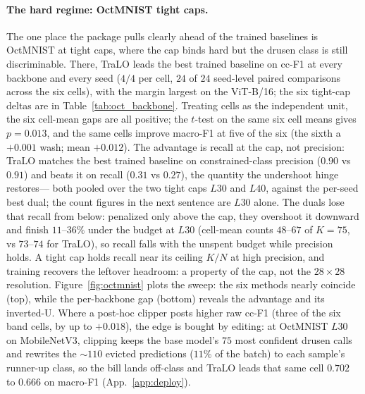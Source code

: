 \documentclass[10pt]{article}
\begin{document}
\paragraph{The hard regime: OctMNIST tight caps.}
The one place the package pulls clearly ahead of the trained baselines is
OctMNIST at tight caps, where the cap binds hard but the drusen class is
still discriminable. There, TraLO leads the best trained baseline on cc-F1
at every backbone and every seed ($4/4$ per cell, $24$ of $24$ seed-level
paired comparisons across the six cells), with the margin largest on the
ViT-B/16; the six tight-cap deltas are in Table~\ref{tab:oct_backbone}.
Treating cells as the independent unit, the six cell-mean gaps are all
positive; the $t$-test on the same six cell means gives $p{=}0.013$, and
the same cells improve macro-F1 at five of the six (the sixth a $+0.001$
wash; mean $+0.012$). The advantage is recall at the cap, not precision:
TraLO matches the best trained baseline on constrained-class precision
($0.90$ vs $0.91$) and beats it on recall ($0.31$ vs $0.27$), the quantity
the undershoot hinge restores{--- both pooled over the two tight
caps $L30$ and $L40$, against the per-seed best dual; the count figures in the
next sentence are $L30$ alone}. The duals lose that recall from below:
penalized only above the cap, they overshoot it downward and finish
$11$--$36\%$ under the budget at $L30$ (cell-mean counts $48$--$67$ of
$K{=}75$, vs $73$--$74$ for TraLO), so recall falls with the unspent
budget while precision holds. A tight cap holds recall near its ceiling
$K/N$ at high precision, and training recovers the leftover headroom: a
property of the cap, not the $28{\times}28$ resolution. Figure~\ref{fig:octmnist}
plots the sweep: the six methods nearly coincide (top), while the
per-backbone gap (bottom) reveals the advantage and its inverted-U. Where a
post-hoc clipper posts higher raw cc-F1 (three of the six band cells, by
up to $+0.018$), the edge is bought by editing: at OctMNIST $L30$ on
MobileNetV3, clipping keeps the base model's $75$ most confident drusen
calls and rewrites the ${\sim}110$ evicted predictions ($11\%$ of the
batch) to each sample's runner-up class, so the bill lands off-class and
TraLO leads that same cell $0.702$ to $0.666$ on macro-F1
(App.~\ref{app:deploy}).
\end{document}
